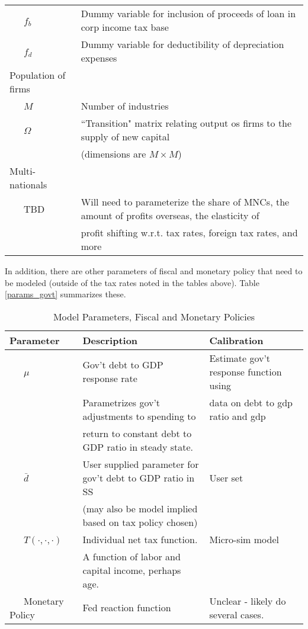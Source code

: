 \documentclass[article,11pt,letterpaper,fleqn]{article}
\theoremstyle{definition}
\numberwithin{equation}{section}
\begin{document}
\begin{table}[htbp]
\begin{tabular}{ll}
    \ \ \ $f_{b}$ & Dummy variable for inclusion of proceeds of loan in corp income tax base \\
    \ \ \ $f_{d}$ & Dummy variable for deductibility of depreciation expenses \\
    Population of firms &  \\
    \ \ \ $M$ & Number of industries \\
    \ \ \ $\Omega$ & ``Transition" matrix relating output os firms to the supply of new capital \\
    & (dimensions are $M\times M$) \\
    Multi-nationals &  \\
    \ \ \ TBD & Will need to parameterize the share of MNCs, the amount of profits overseas, the elasticity of \\
    & profit shifting w.r.t. tax rates, foreign tax rates, and more \\
    \hline
    \hline
    \end{tabular}%
  \label{tab:params_supply}%
\end{table}%

In addition, there are other parameters of fiscal and monetary policy that need to be modeled (outside of the tax rates noted in the tables above).  Table \ref{params_govt} summarizes these.

\begin{table}[htbp]
  \centering
  \caption{Model Parameters, Fiscal and Monetary Policies}
    \begin{tabular}{lll}
    \hline
    \hline
    Parameter & Description & Calibration \\
    \hline
    \ \ \ $\mu$ & Gov't debt to GDP response rate & Estimate gov't response function using  \\
    &Parametrizes gov't adjustments to spending to &data on debt to gdp ratio and gdp \\
    &  return to constant debt to GDP ratio in steady state.  & \\
    \ \ \ $\bar{d}$ & User supplied parameter for gov't debt to GDP ratio in SS & User set \\
    &  (may also be model implied based on tax policy chosen) & \\
    \ \ \ $T(\cdot,\cdot,\cdot)$ & Individual net tax function.   & Micro-sim model \\
    & A function of labor and capital income, perhaps age. &  \\
    \ \ \ Monetary Policy & Fed reaction function & Unclear - likely do several cases. \\
    \hline
    \hline
    \end{tabular}%
  \label{tab:params_govt}%
\end{table}%
\end{document}
